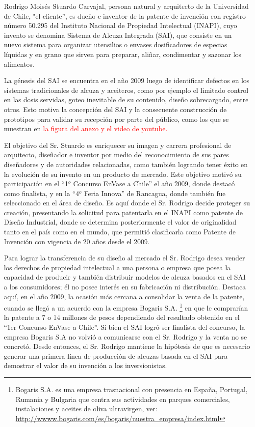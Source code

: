 Rodrigo Moisés Stuardo Carvajal, persona natural y arquitecto de la Universidad de Chile, "el cliente'', es dueño e inventor de la patente de invención con registro número 50.295 del Instituto Nacional de Propiedad Intelectual (INAPI), cuyo invento se denomina Sistema de Alcuza Integrada (SAI), que consiste en un nuevo sistema para organizar utensilios o envases dosificadores de especias líquidas y en grano que sirven para preparar, aliñar, condimentar y sazonar los alimentos.

La génesis del SAI se encuentra en el año 2009 luego de identificar defectos en los sistemas tradicionales de alcuza y aceiteros, como por ejemplo el limitado control en las dosis servidas, goteo inevitable de su contenido, diseño sobrecargado, entre otros. Esto motiva la concepción del SAI y la consecuente construcción de prototipos para validar su recepción por parte del público, como los que se muestran en \textcolor{red}{la figura del anexo y el video de youtube.}

El objetivo del Sr. Stuardo es enriquecer su imagen y carrera profesional de arquitecto, diseñador e inventor por medio del reconocimiento de sus pares diseñadores y de autoridades relacionadas, como también logrando tener éxito en la evolución de su invento en un producto de mercado. Este objetivo motivó su participación en el  “1$^{o}$  Concurso EnVase a Chile” el año 2009, donde destacó como finalista, y en la “4$^{o}$ Feria Innova” de Rancagua, donde también fue seleccionado en el área de diseño. Es aquí donde el Sr. Rodrigo decide proteger su creación, presentando la solicitud para patentarla en el INAPI como patente de Diseño Industrial, donde se determina posteriormente el valor de originalidad tanto en el país como en el mundo, que permitió clasificarla como Patente de Invención con vigencia de 20 años desde el 2009.

Para lograr la transferencia de su diseño al mercado el Sr. Rodrigo desea vender los derechos de propiedad intelectual a una persona o empresa que posea la capacidad de producir y también distribuir modelos de alcuza basados en el SAI a los consumidores; él no posee interés en su fabricación ni distribución. Destaca aquí, en el año 2009, la ocasión más cercana a consolidar la venta de la patente, cuando se llegó a un acuerdo con la empresa Bogaris S.A.
\footnote{
Bogaris S.A. es una empresa trasnacional con presencia en España, Portugal, Rumania y Bulgaria que centra sus actividades en parques comerciales, instalaciones y aceites de oliva ultravirgen, ver:
 \url{http://wwww.bogaris.com/es/bogaris/nuestra_empresa/index.html}

 }
 en que le comprarían la patente a 7 o 14 millones de pesos dependiendo del resultado obtenido en el “1er Concurso EnVase a Chile”. Si bien el SAI logró ser finalista del concurso, la empresa Bogaris S.A no volvió a comunicarse con el Sr. Rodrigo y la venta no se concretó. Desde entonces, el Sr. Rodrigo mantiene la hipótesis de que es necesario generar una primera línea de producción de alcuzas basada en el SAI para demostrar el valor de su invención a los inversionistas.

